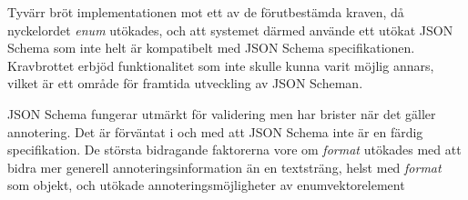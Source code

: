 Tyvärr bröt implementationen mot ett av de förutbestämda kraven, då nyckelordet \textit{enum} utökades, och att systemet därmed använde ett utökat JSON Schema som inte helt är kompatibelt med JSON Schema specifikationen. Kravbrottet erbjöd funktionalitet som inte skulle kunna varit möjlig annars, vilket är ett område för framtida utveckling av JSON Scheman.

JSON Schema fungerar utmärkt för validering men har brister när det gäller annotering. Det är förväntat i och med att JSON Schema inte är en färdig specifikation. De största bidragande faktorerna vore om \textit{format} utökades med att bidra mer generell annoteringsinformation än en textsträng, helst med \textit{format} som objekt, och utökade annoteringsmöjligheter av enumvektorelement